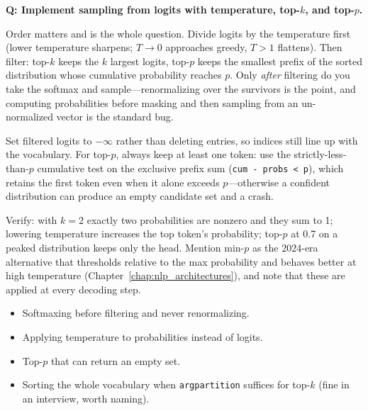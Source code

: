 \begin{interviewq}
\textbf{Q: Implement sampling from logits with temperature, top-$k$, and top-$p$.}

 \quad {} \quad \badgefreq{\freqhigh}

\stronganswer

Order matters and is the whole question. Divide logits by the temperature first (lower temperature sharpens; $T \to 0$ approaches greedy, $T > 1$ flattens). Then filter: top-$k$ keeps the $k$ largest logits, top-$p$ keeps the smallest prefix of the sorted distribution whose cumulative probability reaches $p$. Only \emph{after} filtering do you take the softmax and sample---renormalizing over the survivors is the point, and computing probabilities before masking and then sampling from an un-normalized vector is the standard bug.

Set filtered logits to $-\infty$ rather than deleting entries, so indices still line up with the vocabulary. For top-$p$, always keep at least one token: use the strictly-less-than-$p$ cumulative test on the exclusive prefix sum (\texttt{cum - probs < p}), which retains the first token even when it alone exceeds $p$---otherwise a confident distribution can produce an empty candidate set and a crash.

Verify: with $k=2$ exactly two probabilities are nonzero and they sum to 1; lowering temperature increases the top token's probability; top-$p$ at 0.7 on a peaked distribution keeps only the head. Mention min-$p$ as the 2024-era alternative that thresholds relative to the max probability and behaves better at high temperature (Chapter~\ref{chap:nlp_architectures}), and note that these are applied at every decoding step.

\redflags
\begin{itemize}
    \item Softmaxing before filtering and never renormalizing.
    \item Applying temperature to probabilities instead of logits.
    \item Top-$p$ that can return an empty set.
    \item Sorting the whole vocabulary when \texttt{argpartition} suffices for top-$k$ (fine in an interview, worth naming).
\end{itemize}



\end{interviewq}
